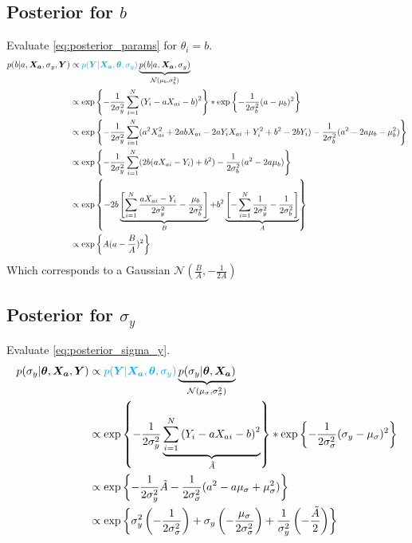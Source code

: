 \documentclass[10pt]{article}
\renewcommand{\vec}[1]{\boldsymbol{#1}}
\begin{document}
\subsection{Posterior for $b$}
Evaluate \cref{eq:posterior_params} for $\theta_i= b$.
\begin{align}
    p(b|a, \vec{X_a}, \sigma_y, \vec{Y}) &\propto {\color{cyan} p(\vec{Y} | \vec{X_a}, \vec{\theta}, \sigma_y)} \underbrace{p(b | a, \vec{X_a}, \sigma_{y})}_{\mathcal{N}(\mu_b, \sigma_b^2)} \\
    &\propto \exp\left\{ - \frac{1}{2\sigma_y^2} \sum_{i=1}^N \left( Y_i - a X_{ai} - b \right)^2 \right\} * \exp\left\{ - \frac{1}{2\sigma_b^2} ( a - \mu_b )^2 \right\} \\
    &\propto \exp\left\{ - \frac{1}{2\sigma_y^2} \sum_{i=1}^N (a^2 X_{ai}^2  + 2 a b X_{ai} - 2 a Y_i X_{ai} + Y_i^2 + b^2 -2 b Y_i )- \frac{1}{2\sigma_b^2} ( a^2 - 2 a \mu_b - \mu_b^2 ) \right\} \\
    &\propto \exp\left\{ - \frac{1}{2\sigma_y^2} \sum_{i=1}^N (2 b (a X_{ai} - Y_i) + b^2 ) - \frac{1}{2\sigma_b^2} ( a^2 - 2 a \mu_b ) \right\} \\
    &\propto \exp\left\{ - 2 b \underbrace{\left[ \sum_{i=1}^N \frac{a X_{ai} - Y_i}{2\sigma_y^2} - \frac{\mu_b}{2\sigma_b^2} \right]}_{B} + b^2 \underbrace{\left[ - \sum_{i=1}^N \frac{1}{2\sigma_y^2}  - \frac{1}{2\sigma_b^2} \right]}_{A} \right\} \\
    &\propto \exp\left\{A (a - \frac{B}{A})^2\right\}
\end{align}
Which corresponds to a Gaussian $\mathcal{N}(\frac{B}{A}, -\frac{1}{2A})$


\subsection{Posterior for $\sigma_y$}
Evaluate \cref{eq:posterior_sigma_y}.
\begin{align}
    p(\sigma_y | \vec{\theta}, \vec{X_a}, \vec{Y}) &\propto {\color{cyan} p(\vec{Y} | \vec{X_a}, \vec{\theta}, \sigma_y)} \underbrace{p(\sigma_y | \vec{\theta}, \vec{X_a})}_{\mathcal{N}(\mu_{\sigma}, \sigma_{\sigma}^2)} \\
    &\propto \exp\left\{ - \frac{1}{2\sigma_y^2} \underbrace{\sum_{i=1}^N \left( Y_i - a X_{ai} - b \right)^2}_{\tilde{A}} \right\} * \exp\left\{ - \frac{1}{2\sigma_{\sigma}^2} ( \sigma_y - \mu_{\sigma} )^2 \right\} \\
    &\propto \exp\left\{ - \frac{1}{2\sigma_y^2} \tilde{A} - \frac{1}{2\sigma_{\sigma}^2} ( a^2 - a \mu_{\sigma} + \mu_{\sigma}^2 ) \right\} \\
    &\propto \exp\left\{ \sigma_y^2 \left( - \frac{1}{2\sigma_{\sigma}^2} \right) + \sigma_y \left( -  \frac{\mu_{\sigma}}{2\sigma_{\sigma}^2}\right) + \frac{1}{\sigma_y^2} \left( - \frac{\tilde{A}}{2} \right) \right\} 
\end{align}
\end{document}
